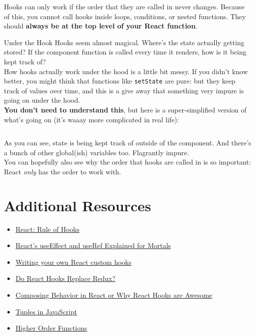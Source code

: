 Hooks can only work if the order that they are called in never changes. Because of this, you cannot call hooks inside loops, conditions, or nested functions. They should \textbf{always be at the top level of your React function}.

\begin{infobox}{Under the Hook}
    Hooks seem almost magical. Where's the state actually getting stored? If the component function is called every time it renders, how is it being kept track of?
    \\

    How hooks actually work under the hood is a little bit messy. If you didn't know better, you might think that functions like \texttt{setState} are pure: but they keep track of values over time, and this is a give away that something very impure is going on under the hood.
    \\

    \textbf{You don't need to understand this}, but here is a super-simplified version of what's going on (it's waaay more complicated in real life):

    \inputminted{js}{04-hooks/figures/15-under-the-hood.js}

    As you can see, state is being kept track of outside of the component. And there's a bunch of other global(ish) variables too. Flagrantly impure.
    \\

    You can hopefully also see why the order that hooks are called in is so important: React \textit{only} has the order to work with.
\end{infobox}


\section{Additional Resources}

\begin{itemize}[leftmargin=*]
    \item \href{http://reactjs.org/docs/hooks-rules.html}{React: Rule of Hooks}
    \item \href{https://leewarrick.com/blog/react-use-effect-explained/}{React's useEffect and useRef Explained for Mortals}
    \item \href{https://tvernon.tech/blog/react-custom-hook-for-forms}{Writing your own React custom hooks}
    \item \href{https://medium.com/javascript-scene/do-react-hooks-replace-redux-210bab340672}{Do React Hooks Replace Redux?}
    \item \href{https://www.youtube.com/watch?v=nUzLlHFVXx0}{Composing Behavior in React or Why React Hooks are Awesome}
    \item \href{https://medium.com/@ntgard/tuples-in-javascript-cd33321e5277}{Tuples in JavaScript}
    \item \href{https://eloquentjavascript.net/05_higher_order.html}{Higher Order Functions}
\end{itemize}
